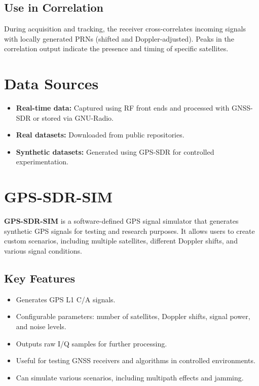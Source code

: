 \documentclass[12pt]{report}
\begin{document}
\subsection{Use in Correlation}
During acquisition and tracking, the receiver cross-correlates incoming signals with locally generated PRNs (shifted and Doppler-adjusted). Peaks in the correlation output indicate the presence and timing of specific satellites.


\section{Data Sources}
\begin{itemize}
  \item \textbf{Real-time data:} Captured using RF front ends and processed with GNSS-SDR or stored via GNU-Radio.
  \item \textbf{Real datasets:} Downloaded from public repositories.
  \item \textbf{Synthetic datasets:} Generated using GPS-SDR for controlled experimentation.
\end{itemize}

\section{GPS-SDR-SIM}
\textbf{GPS-SDR-SIM} is a software-defined GPS signal simulator that generates synthetic GPS signals for testing and research purposes. It allows users to create custom scenarios, including multiple satellites, different Doppler shifts, and various signal conditions.
\subsection{Key Features}
\begin{itemize}
  \item Generates GPS L1 C/A signals.
  \item Configurable parameters: number of satellites, Doppler shifts, signal power, and noise levels.
  \item Outputs raw I/Q samples for further processing.
  \item Useful for testing GNSS receivers and algorithms in controlled environments.
  \item Can simulate various scenarios, including multipath effects and jamming.
\end{itemize}
\end{document}
